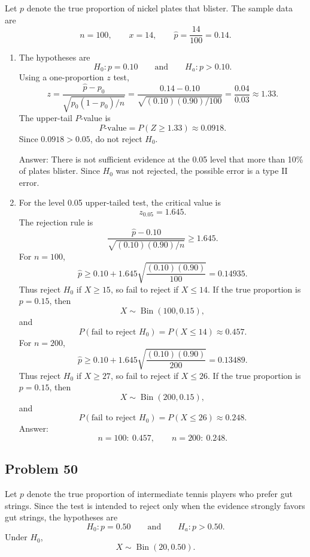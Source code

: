 \documentclass[11pt]{article}
\begin{document}
Let $p$ denote the true proportion of nickel plates that blister. The sample data are
\[
n=100,
\qquad x=14,
\qquad \hat{p}=\frac{14}{100}=0.14.
\]

\begin{enumerate}
\item[(a)] The hypotheses are
\[
H_0:p=0.10
\qquad \text{and} \qquad
H_a:p>0.10.
\]
Using a one-proportion $z$ test,
\[
z=\frac{\hat{p}-p_0}{\sqrt{p_0(1-p_0)/n}}
=\frac{0.14-0.10}{\sqrt{(0.10)(0.90)/100}}
=\frac{0.04}{0.03}
\approx 1.33.
\]
The upper-tail $P$-value is
\[
P\text{-value}=P(Z\ge 1.33)\approx 0.0918.
\]
Since $0.0918>0.05$, do not reject $H_0$.

Answer: There is not sufficient evidence at the 0.05 level that more than 10\% of plates blister. Since $H_0$ was not rejected, the possible error is a type II error.

\item[(b)] For the level 0.05 upper-tailed test, the critical value is
\[
z_{0.05}=1.645.
\]
The rejection rule is
\[
\frac{\hat{p}-0.10}{\sqrt{(0.10)(0.90)/n}}\ge 1.645.
\]
For $n=100$,
\[
\hat{p}\ge 0.10+1.645\sqrt{\frac{(0.10)(0.90)}{100}}
=0.14935.
\]
Thus reject $H_0$ if $X\ge 15$, so fail to reject if $X\le 14$. If the true proportion is $p=0.15$, then
\[
X\sim \operatorname{Bin}(100,0.15),
\]
and
\[
P(\text{fail to reject }H_0)=P(X\le 14)\approx 0.457.
\]
For $n=200$,
\[
\hat{p}\ge 0.10+1.645\sqrt{\frac{(0.10)(0.90)}{200}}
=0.13489.
\]
Thus reject $H_0$ if $X\ge 27$, so fail to reject if $X\le 26$. If the true proportion is $p=0.15$, then
\[
X\sim \operatorname{Bin}(200,0.15),
\]
and
\[
P(\text{fail to reject }H_0)=P(X\le 26)\approx 0.248.
\]
Answer:
\[
n=100:\ 0.457,
\qquad
n=200:\ 0.248.
\]
\end{enumerate}

\subsection*{Problem 50}

Let $p$ denote the true proportion of intermediate tennis players who prefer gut strings. Since the test is intended to reject only when the evidence strongly favors gut strings, the hypotheses are
\[
H_0:p=0.50
\qquad \text{and} \qquad
H_a:p>0.50.
\]
Under $H_0$,
\[
X\sim \operatorname{Bin}(20,0.50).
\]
\end{document}
